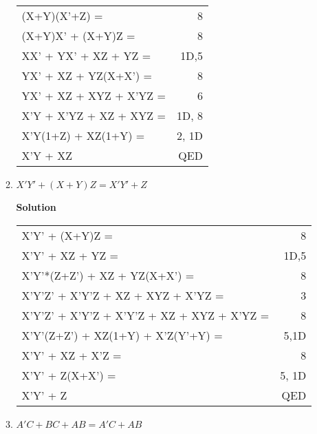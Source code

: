 \begin{enumerate}
\begin{enumerate}
\begin{onlysolution}
                    \begin{tabular}{lr}
                        (X+Y)(X'+Z) =         & 8 \\
                        (X+Y)X' + (X+Y)Z =     & 8 \\
                        XX' + YX' + XZ + YZ =    & 1D,5 \\
                        YX' + XZ + YZ(X+X') =      & 8 \\
                        YX' + XZ + XYZ + X'YZ =    & 6  \\
                        X'Y + X'YZ + XZ + XYZ =    & 1D, 8 \\
                        X'Y(1+Z) + XZ(1+Y) =      & 2, 1D \\
                        X'Y + XZ         & QED \\
                    \end{tabular}
                \end{onlysolution}

            \item $X'Y' + (X+Y)Z = X'Y' + Z$

                \begin{onlysolution}  \textbf{Solution} \itshape

                    \begin{tabular}{lr}
                        X'Y' + (X+Y)Z =                 & 8\\
                        X'Y' + XZ + YZ =                 & 1D,5 \\
                        X'Y'*(Z+Z') + XZ + YZ(X+X') =              & 8 \\
                        X'Y'Z' + X'Y'Z + XZ + XYZ + X'YZ =          & 3 \\
                        X'Y'Z' + X'Y'Z + X'Y'Z + XZ + XYZ + X'YZ =      & 8 \\
                        X'Y'(Z+Z') + XZ(1+Y) + X'Z(Y'+Y) =          & 5,1D \\
                        X'Y' + XZ + X'Z  =                  & 8 \\
                        X'Y' + Z(X+X') =                  & 5, 1D\\
                        X'Y' + Z                     & QED \\
                    \end{tabular}
                \end{onlysolution}

            \item $A'C+BC+AB = A'C+AB$


\end{enumerate}
\end{enumerate}
